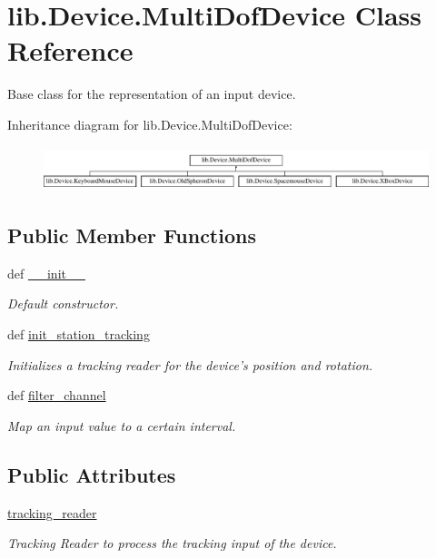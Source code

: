 \hypertarget{classlib_1_1Device_1_1MultiDofDevice}{\section{lib.\-Device.\-Multi\-Dof\-Device \-Class \-Reference}
\label{classlib_1_1Device_1_1MultiDofDevice}
}


\-Base class for the representation of an input device.  


\-Inheritance diagram for lib.\-Device.\-Multi\-Dof\-Device\-:\begin{figure}[H]
\begin{center}
\leavevmode
\includegraphics[height=1.308411cm]{classlib_1_1Device_1_1MultiDofDevice}
\end{center}
\end{figure}
\subsection*{\-Public \-Member \-Functions}
\begin{DoxyCompactItemize}
\item 
def \hyperlink{classlib_1_1Device_1_1MultiDofDevice_a0e2a46c6f1137180f78d257629c60d79}{\-\_\-\-\_\-init\-\_\-\-\_\-}
\begin{DoxyCompactList}\small\item\em \-Default constructor. \end{DoxyCompactList}\item 
def \hyperlink{classlib_1_1Device_1_1MultiDofDevice_afc9f3ca31bfc426a12d0128b44ecac81}{init\-\_\-station\-\_\-tracking}
\begin{DoxyCompactList}\small\item\em \-Initializes a tracking reader for the device's position and rotation. \end{DoxyCompactList}\item 
def \hyperlink{classlib_1_1Device_1_1MultiDofDevice_ae957a7f95a7c8a15be9eac3ee45f30ea}{filter\-\_\-channel}
\begin{DoxyCompactList}\small\item\em \-Map an input value to a certain interval. \end{DoxyCompactList}\end{DoxyCompactItemize}
\subsection*{\-Public \-Attributes}
\begin{DoxyCompactItemize}
\item 
\hyperlink{classlib_1_1Device_1_1MultiDofDevice_a707b8d75550724801392ad592e1204d9}{tracking\-\_\-reader}
\begin{DoxyCompactList}\small\item\em \-Tracking \-Reader to process the tracking input of the device. \end{DoxyCompactList}\end{DoxyCompactItemize}
